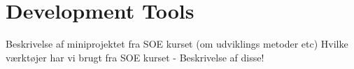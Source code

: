 \chapter{Development Tools}
	\label{cha:development_tools}
Beskrivelse af miniprojektet fra SOE kurset (om udviklings metoder etc)
Hvilke værktøjer har vi brugt fra SOE kurset
- Beskrivelse af disse!
%
%
